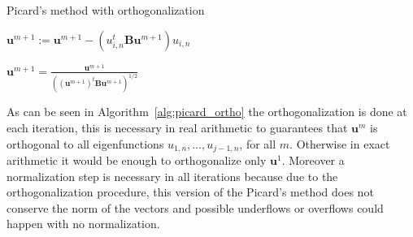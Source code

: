 \documentclass[preprint ,12pt]{elsarticle}
\begin{document}


\begin{algorithm}[H] \caption{Picard's method with orthogonalization} \label{alg:picard_ortho} 
\begin{algorithmic}

    

\REPEAT



\STATE $\mathbf{u}^{m+1}:=\mathbf{u}^{m+1}-(u_{i,n}^t\mathbf{B}\mathbf{u}^{m+1})u_{i,n}$
\ENDFOR


\STATE $\displaystyle \mathbf{u}^{m+1}=\frac{\mathbf{u}^{m+1}}{((\mathbf{u}^{m+1})^t\mathbf{B}\mathbf{u}^{m+1})^{1/2}}$
\end{algorithmic}
\end{algorithm}

As can be seen in Algorithm~\ref{alg:picard_ortho}  the orthogonalization is done at each iteration, this is necessary in real arithmetic to guarantees that $\mathbf{u}^m$ is orthogonal to all eigenfunctions $u_{1,n},\dots,u_{j-1,n}$, for all $m$. Otherwise in exact arithmetic it would be enough to orthogonalize only $\mathbf{u}^1$. Moreover a normalization step is necessary in all iterations because due to the orthogonalization procedure, this version of the Picard's method does not conserve the norm of the vectors and possible underflows or overflows could happen with no normalization.

\end{document}
